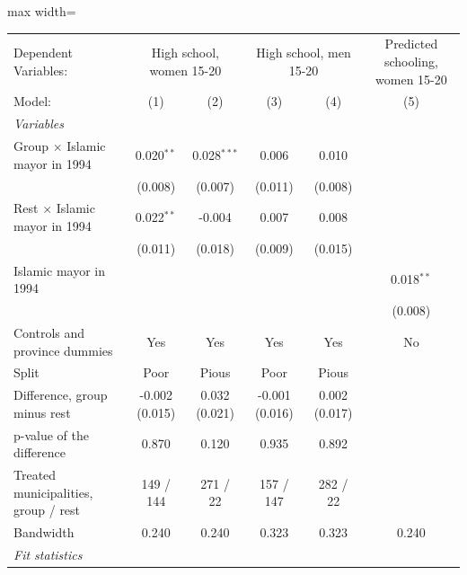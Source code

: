 
\begingroup
\centering
\begin{adjustbox}{max width=\textwidth}
   \begin{tabular}{lccccc}
      \tabularnewline \midrule \midrule
      Dependent Variables: & \multicolumn{2}{c}{High school, women 15-20} & \multicolumn{2}{c}{High school, men 15-20} & Predicted schooling, women 15-20\\
      Model:                                & (1)            & (2)           & (3)            & (4)           & (5)\\  
      \midrule
      \emph{Variables}\\
      Group $\times$ Islamic mayor in 1994  & 0.020$^{**}$   & 0.028$^{***}$ & 0.006          & 0.010         &   \\   
                                            & (0.008)        & (0.007)       & (0.011)        & (0.008)       &   \\   
      Rest $\times$ Islamic mayor in 1994   & 0.022$^{**}$   & -0.004        & 0.007          & 0.008         &   \\   
                                            & (0.011)        & (0.018)       & (0.009)        & (0.015)       &   \\   
      Islamic mayor in 1994                 &                &               &                &               & 0.018$^{**}$\\   
                                            &                &               &                &               & (0.008)\\   
      Controls and province dummies         & Yes            & Yes           & Yes            & Yes           & No\\  
      Split                                 & Poor           & Pious         & Poor           & Pious         & \\  
      Difference, group minus rest          & -0.002 (0.015) & 0.032 (0.021) & -0.001 (0.016) & 0.002 (0.017) & \\  
      p-value of the difference             & 0.870          & 0.120         & 0.935          & 0.892         & \\  
      Treated municipalities, group / rest  & 149 / 144      & 271 / 22      & 157 / 147      & 282 / 22      & \\  
      Bandwidth                             & 0.240          & 0.240         & 0.323          & 0.323         & 0.240\\  
      \midrule
      \emph{Fit statistics}\\

\end{tabular}
\end{adjustbox}
